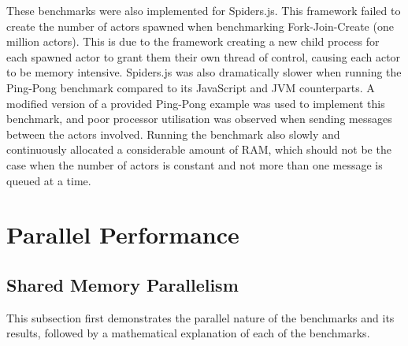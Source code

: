 \documentclass[oneside]{um-fict}
\begin{document}
These benchmarks were also implemented for Spiders.js. This framework failed to create the number of actors spawned when benchmarking Fork-Join-Create (one million actors). This is due to the framework creating a new child process for each spawned actor to grant them their own thread of control, causing each actor to be memory intensive. Spiders.js was also dramatically slower when running the Ping-Pong benchmark compared to its JavaScript and JVM counterparts. A modified version of a provided Ping-Pong example was used to implement this benchmark, and poor processor utilisation was observed when sending messages between the actors involved. Running the benchmark also slowly and continuously allocated a considerable amount of RAM, which should not be the case when the number of actors is constant and not more than one message is queued at a time.
\section{Parallel Performance}\label{section:parallel}
\subsection{Shared Memory Parallelism}
This subsection first demonstrates the parallel nature of the benchmarks and its results, followed by a mathematical explanation of each of the benchmarks.
\end{document}
